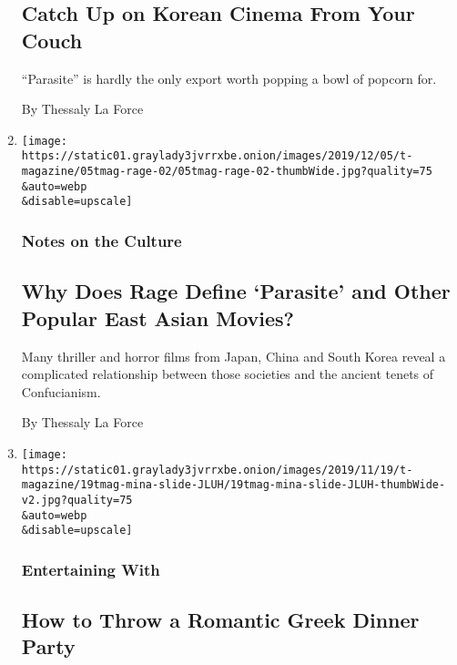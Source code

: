 \begin{enumerate}
  \hypertarget{catch-up-on-korean-cinema-from-your-couch}{%
  \subsection{Catch Up on Korean Cinema From Your
  Couch}\label{catch-up-on-korean-cinema-from-your-couch}}

  ``Parasite'' is hardly the only export worth popping a bowl of popcorn
  for.

  By Thessaly La Force
\item
  \href{/2019/11/25/t-magazine/asia-movies-parasite.html}{}

  \texttt{[image: https://static01.graylady3jvrrxbe.onion/images/2019/12/05/t-magazine/05tmag-rage-02/05tmag-rage-02-thumbWide.jpg?quality=75\\\&auto=webp\\\&disable=upscale]}

  \hypertarget{notes-on-the-culture}{%
  \subsubsection{Notes on the Culture}\label{notes-on-the-culture}}

  \hypertarget{why-does-rage-define-parasite-and-other-popular-east-asian-movies}{%
  \subsection{Why Does Rage Define `Parasite' and Other Popular East
  Asian
  Movies?}\label{why-does-rage-define-parasite-and-other-popular-east-asian-movies}}

  Many thriller and horror films from Japan, China and South Korea
  reveal a complicated relationship between those societies and the
  ancient tenets of Confucianism.

  By Thessaly La Force
\item
  \href{/2019/11/19/t-magazine/mina-stone.html}{}

  \texttt{[image: https://static01.graylady3jvrrxbe.onion/images/2019/11/19/t-magazine/19tmag-mina-slide-JLUH/19tmag-mina-slide-JLUH-thumbWide-v2.jpg?quality=75\\\&auto=webp\\\&disable=upscale]}

  \hypertarget{entertaining-with}{%
  \subsubsection{Entertaining With}\label{entertaining-with}}

  \hypertarget{how-to-throw-a-romantic-greek-dinner-party}{%
  \subsection{How to Throw a Romantic Greek Dinner
  Party}\label{how-to-throw-a-romantic-greek-dinner-party}}


\end{enumerate}
